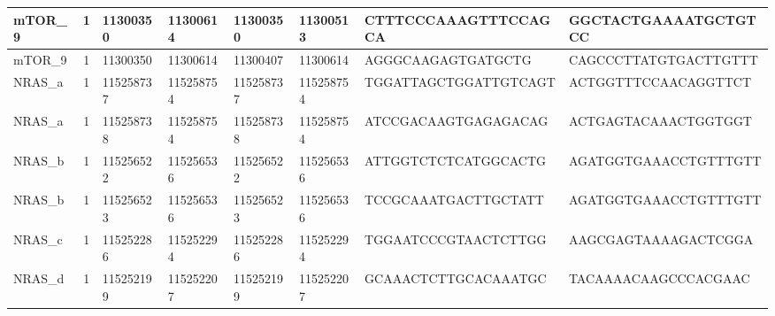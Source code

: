\begin{landscape}
\begin{longtable}{| p{} | p{} | p{} | p{} | p{} | p{} | p{} | p{} |}
\multicolumn{1}{|l|}{mTOR\_9}    & \multicolumn{1}{c|}{1}  & \multicolumn{1}{l|}{11300350}  & \multicolumn{1}{l|}{11300614}  & \multicolumn{1}{l|}{11300350}  & \multicolumn{1}{l|}{11300513}  & \multicolumn{1}{l|}{CTTTCCCAAAGTTTCCAGCA}            & \multicolumn{1}{l|}{GGCTACTGAAAATGCTGTCC}          \\ \hline
\multicolumn{1}{|l|}{mTOR\_9}    & \multicolumn{1}{c|}{1}  & \multicolumn{1}{l|}{11300350}  & \multicolumn{1}{l|}{11300614}  & \multicolumn{1}{l|}{11300407}  & \multicolumn{1}{l|}{11300614}  & \multicolumn{1}{l|}{AGGGCAAGAGTGATGCTG}              & \multicolumn{1}{l|}{CAGCCCTTATGTGACTTGTTT}         \\ \hline
\multicolumn{1}{|l|}{NRAS\_a}    & \multicolumn{1}{c|}{1}  & \multicolumn{1}{l|}{115258737} & \multicolumn{1}{l|}{115258754} & \multicolumn{1}{l|}{115258737} & \multicolumn{1}{l|}{115258754} & \multicolumn{1}{l|}{TGGATTAGCTGGATTGTCAGT}           & \multicolumn{1}{l|}{ACTGGTTTCCAACAGGTTCT}          \\ \hline
\multicolumn{1}{|l|}{NRAS\_a}    & \multicolumn{1}{c|}{1}  & \multicolumn{1}{l|}{115258738} & \multicolumn{1}{l|}{115258754} & \multicolumn{1}{l|}{115258738} & \multicolumn{1}{l|}{115258754} & \multicolumn{1}{l|}{ATCCGACAAGTGAGAGACAG}            & \multicolumn{1}{l|}{ACTGAGTACAAACTGGTGGT}          \\ \hline
\multicolumn{1}{|l|}{NRAS\_b}    & \multicolumn{1}{c|}{1}  & \multicolumn{1}{l|}{115256522} & \multicolumn{1}{l|}{115256536} & \multicolumn{1}{l|}{115256522} & \multicolumn{1}{l|}{115256536} & \multicolumn{1}{l|}{ATTGGTCTCTCATGGCACTG}            & \multicolumn{1}{l|}{AGATGGTGAAACCTGTTTGTT}         \\ \hline
\multicolumn{1}{|l|}{NRAS\_b}    & \multicolumn{1}{c|}{1}  & \multicolumn{1}{l|}{115256523} & \multicolumn{1}{l|}{115256536} & \multicolumn{1}{l|}{115256523} & \multicolumn{1}{l|}{115256536} & \multicolumn{1}{l|}{TCCGCAAATGACTTGCTATT}            & \multicolumn{1}{l|}{AGATGGTGAAACCTGTTTGTT}         \\ \hline
\multicolumn{1}{|l|}{NRAS\_c}    & \multicolumn{1}{c|}{1}  & \multicolumn{1}{l|}{115252286} & \multicolumn{1}{l|}{115252294} & \multicolumn{1}{l|}{115252286} & \multicolumn{1}{l|}{115252294} & \multicolumn{1}{l|}{TGGAATCCCGTAACTCTTGG}            & \multicolumn{1}{l|}{AAGCGAGTAAAAGACTCGGA}          \\ \hline
\multicolumn{1}{|l|}{NRAS\_d}    & \multicolumn{1}{c|}{1}  & \multicolumn{1}{l|}{115252199} & \multicolumn{1}{l|}{115252207} & \multicolumn{1}{l|}{115252199} & \multicolumn{1}{l|}{115252207} & \multicolumn{1}{l|}{GCAAACTCTTGCACAAATGC}            & \multicolumn{1}{l|}{TACAAAACAAGCCCACGAAC}          \\ \hline

\end{longtable}
\end{landscape}
